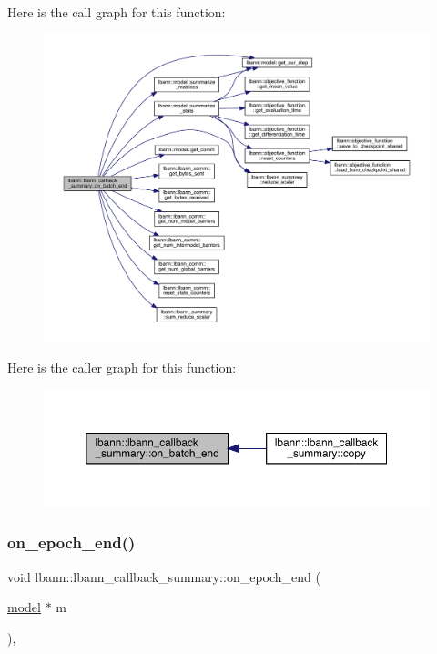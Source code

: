 Here is the call graph for this function\+:\nopagebreak
\begin{figure}[H]
\begin{center}
\leavevmode
\includegraphics[width=350pt]{classlbann_1_1lbann__callback__summary_a89b18186fdaa7b6a7a0e9ab8ee334d88_cgraph}
\end{center}
\end{figure}
Here is the caller graph for this function\+:\nopagebreak
\begin{figure}[H]
\begin{center}
\leavevmode
\includegraphics[width=350pt]{classlbann_1_1lbann__callback__summary_a89b18186fdaa7b6a7a0e9ab8ee334d88_icgraph}
\end{center}
\end{figure}
\mbox{\label{classlbann_1_1lbann__callback__summary_a404e64dcedfcba611510379f99dcace9}} 
\subsubsection{\texorpdfstring{on\+\_\+epoch\+\_\+end()}{on\_epoch\_end()}}
{\footnotesize\ttfamily void lbann\+::lbann\+\_\+callback\+\_\+summary\+::on\+\_\+epoch\+\_\+end (\begin{DoxyParamCaption}\item[{\hyperlink{classlbann_1_1model}{model} $\ast$}]{m }\end{DoxyParamCaption})\hspace{0.3cm}{\ttfamily [override]}, {\ttfamily [virtual]}}

